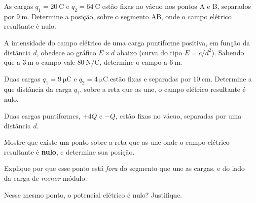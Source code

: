 \blocoaprofundamento
\begin{questao}[3]{}

As cargas $q_1 = \SI{20}{\coulomb}$ e $q_2 = \SI{64}{\coulomb}$ estão fixas no
vácuo nos pontos A e B, separados por $\SI{9}{\meter}$. Determine a posição, sobre
o segmento AB, onde o campo elétrico resultante é nulo.


\end{questao}
\begin{questao}[3]{}

A intensidade do campo elétrico de uma carga puntiforme positiva, em função da
distância $d$, obedece ao gráfico $E \times d$ abaixo (curva do tipo $E = c/d^2$).
Sabendo que a $\SI{3}{\meter}$ o campo vale $\SI{80}{\newton\per\coulomb}$,
determine o campo a $\SI{6}{\meter}$.




\end{questao}
\begin{questao}[3]{}

Duas cargas $q_1 = \SI{+9}{\micro\coulomb}$ e $q_2 = \SI{+4}{\micro\coulomb}$
estão fixas e separadas por $\SI{10}{\centi\meter}$. Determine a que distância da
carga $q_1$, sobre a reta que as une, o campo elétrico resultante é nulo.


\end{questao}
\begin{questao}[3]{}

Duas cargas puntiformes, $+4Q$ e $-Q$, estão fixas no vácuo, separadas por uma
distância $d$.
\begin{itensq}
\item Mostre que existe um ponto sobre a reta que as une onde o campo elétrico
      resultante é \textbf{nulo}, e determine sua posição.
\item Explique por que esse ponto está \emph{fora} do segmento que une as cargas,
      e do lado da carga de \emph{menor} módulo.
\item Nesse mesmo ponto, o potencial elétrico é nulo? Justifique.
\end{itensq}


\end{questao}
